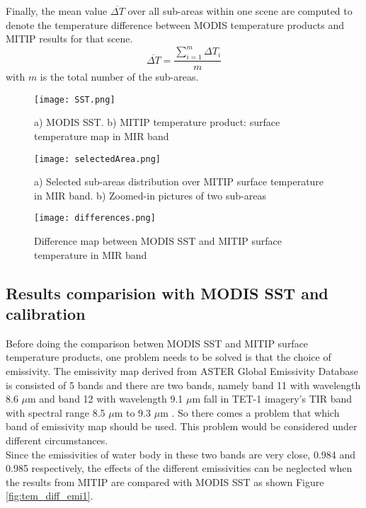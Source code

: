 \noindent Finally, the mean value $\overline{\Delta T}$ over all sub-areas within one scene are computed to denote the temperature difference between MODIS temperature products and MITIP results for that scene.\\
\begin{equation}
\label{eq1}
\overline{\Delta T} =\frac{\sum_{i=1}^m \Delta T_i}{m}
\end{equation}
with $m$ is the total number of the sub-areas.

\begin{figure}[!htbp]
\centering\texttt{[image: SST.png]}
\caption{a) MODIS SST. b) MITIP temperature product: surface temperature map in MIR band}
\label{fig:SST}

\centering\texttt{[image: selectedArea.png]}
\caption{a) Selected sub-areas distribution over MITIP surface temperature in MIR band. b) Zoomed-in pictures of two sub-areas}
\label{fig:selectedArea}
\end{figure}

\begin{figure}[!htbp]
\centering\texttt{[image: differences.png]}
\caption{Difference map between MODIS SST and MITIP surface temperature in MIR band}
\label{fig:Diff}
\end{figure}


\subsection{Results comparision with MODIS SST and calibration}
Before doing the comparison betwen MODIS SST and MITIP surface temperature products, one problem needs to be solved is that the choice of emissivity. The emissivity map derived from ASTER Global Emissivity Database is consisted of 5 bands and there are two bands, namely band 11 with wavelength 8.6 $\mu$m and band 12 with wavelength 9.1 $\mu$m fall in TET-1 imagery's TIR band with spectral range 8.5 $\mu$m to 9.3 $\mu$m \parencite{Reference306}. So there comes a problem that which band of emissivity map should be used. This problem would be considered under different circumstances.\\

\noindent Since the emissivities of water body in these two bands are very close, 0.984  and 0.985 respectively, the effects of the different emissivities can be neglected when the results from MITIP are compared with MODIS SST as shown Figure \ref{fig:tem_diff_emi1}.\\

